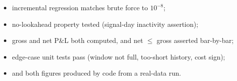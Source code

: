 \begin{itemize}
  \item[\checkmark] incremental regression matches brute force to $10^{-8}$;
  \item[\checkmark] no-lookahead property tested (signal-day inactivity assertion);
  \item[\checkmark] gross and net P\&L both computed, and net $\le$ gross asserted
    bar-by-bar;
  \item[\checkmark] edge-case unit tests pass (window not full, too-short history, cost
    sign);
  \item[\checkmark]  and both figures produced
    by code from a real-data run.
\end{itemize}
